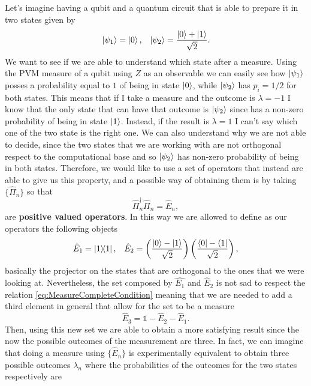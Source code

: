 Let's imagine having a qubit and a quantum circuit that is able to prepare it in two states given by
\begin{align}
    &\ket{\psi_1} = \ket{0}, & \ket{\psi_2} = \frac{\ket{0} + \ket{1}}{\sqrt{2}}.
\end{align}
We want to see if we are able to understand which state after a measure. Using the PVM measure of a qubit using $Z$ as an observable we can easily see how $\ket{\psi_1}$ posses a probability equal to $1$ of being in state $\ket{0}$, while $\ket{\psi_2}$ has $p_i = 1/2$ for both states. This means that if I take a measure and the outcome is $\lambda = -1$ I know that the only state that can have that outcome is $\ket{\psi_2}$ since has a non-zero probability of being in state $\ket{1}$. Instead, if the result is $\lambda = 1$ I can't say which one of the two state is the right one. We can also understand why we are not able to decide, since the two states that we are working with are not orthogonal respect to the computational base and so $\ket{\psi_2}$ has non-zero probability of being in both states. Therefore, we would like to use a set of operators that instead are able to give us this property, and a possible way of obtaining them is by taking $\{ \hat{\Pi}_n \}$ so that
\begin{equation}
    \hat{\Pi}_n^\dagger\hat{\Pi}_n = \hat{E}_n,
\end{equation}
are \textbf{positive valued operators}. In this way we are allowed to define as our operators the following objects
\begin{align}
    &\hat{E}_1 = \ketbra{1}, &\hat{E}_2 = \left( \frac{\ket{0} - \ket{1}}{\sqrt{2}} \right)\left( \frac{\bra{0} - \bra{1}}{\sqrt{2}} \right),
\end{align}
basically the projector on the states that are orthogonal to the ones that we were looking at. Nevertheless, the set composed by $\hat{E_1}$ and $\hat{E}_2$ is not sad to respect the relation \eqref{eq:MeasureCompleteCondition} meaning that we are needed to add a third element in general that allow for the set to be a measure
\begin{equation}
    \hat{E}_3 = \mathbb{1} - \hat{E}_2 - \hat{E}_1.
\end{equation}
Then, using this new set we are able to obtain a more satisfying result since the now the possible outcomes of the measurement are three. In fact, we can imagine that doing a measure using $\{\hat{E}_n\}$ is experimentally equivalent to obtain three possible outcomes $\lambda_n$ where the probabilities of the outcomes for the two states respectively are
